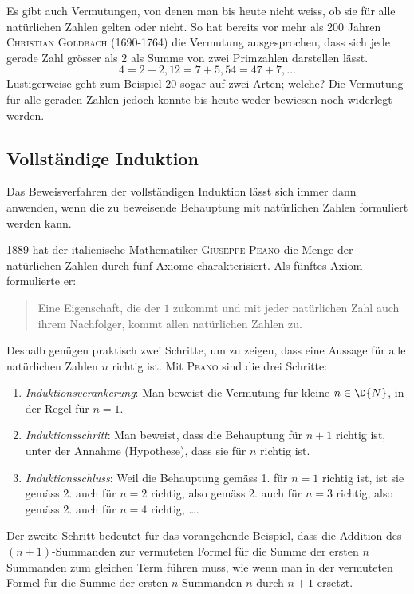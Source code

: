 \documentclass[%
11pt,%
twoside,%
titlepage,%
german,%
headsepline%
]{scrartcl}
\begin{document}
\begin{bem}
Es gibt auch Vermutungen, von denen man bis heute nicht weiss, ob sie f\"ur alle nat\"urlichen Zahlen gelten oder nicht. So hat bereits vor mehr als 200 Jahren \textsc{Christian Goldbach} (1690-1764) die Vermutung ausgesprochen, dass sich jede gerade Zahl gr\"osser als $2$ als Summe von zwei Primzahlen darstellen l\"asst.
$$4 = 2 + 2, 12 = 7 + 5, 54 = 47 + 7, \dots$$
Lustigerweise geht zum Beispiel $20$ sogar auf zwei Arten; welche?
Die Vermutung f\"ur alle geraden Zahlen jedoch konnte bis heute weder bewiesen noch widerlegt werden.
\end{bem}

\subsection{Vollst\"andige Induktion}
Das Beweisverfahren der vollst\"andigen Induktion l\"asst sich immer
dann anwenden, wenn die zu beweisende Behauptung mit nat\"urlichen
Zahlen formuliert werden kann.

1889 hat der italienische Mathematiker \textsc{Giuseppe Peano} die Menge der nat\"urlichen Zahlen durch f\"unf Axiome charakterisiert. Als f\"unftes Axiom formulierte er:
\begin{quote}
Eine Eigenschaft, die der $1$ zukommt und mit jeder nat\"urlichen Zahl auch ihrem Nachfolger, kommt allen nat\"urlichen Zahlen zu.
\end{quote}
Deshalb gen\"ugen praktisch zwei Schritte, um zu zeigen, dass eine Aussage f\"ur alle nat\"urlichen Zahlen $n$ richtig ist. Mit \textsc{Peano} sind die drei Schritte:

\begin{enumerate}
  \item \emph{Induktionsverankerung}: Man beweist die Vermutung f\"ur kleine $n\in\D{N}$, in der
  Regel f\"ur $n=1$.
  \item \emph{Induktionsschritt}: Man beweist, dass die Behauptung f\"ur $n+1$ richtig ist,
  unter der Annahme (Hypothese), dass sie f\"ur $n$ richtig ist.
  \item \emph{Induktionsschluss}: Weil die Behauptung gem\"ass 1. f\"ur $n=1$ richtig ist, ist sie
  gem\"ass 2. auch f\"ur $n=2$ richtig, also gem\"ass 2. auch f\"ur $n=3$
  richtig, also gem\"ass 2. auch f\"ur $n=4$ richtig, \dots.
\end{enumerate}

\begin{bem}
  Der zweite Schritt bedeutet f\"ur das vorangehende Beispiel, dass
  die Addition des $(n+1)$-Summanden zur vermuteten Formel f\"ur die
  Summe der ersten $n$ Summanden zum gleichen Term f\"uhren muss, wie
  wenn man in der vermuteten Formel f\"ur die Summe der ersten $n$
  Summanden $n$ durch $n+1$ ersetzt.
\end{bem}
\end{document}
